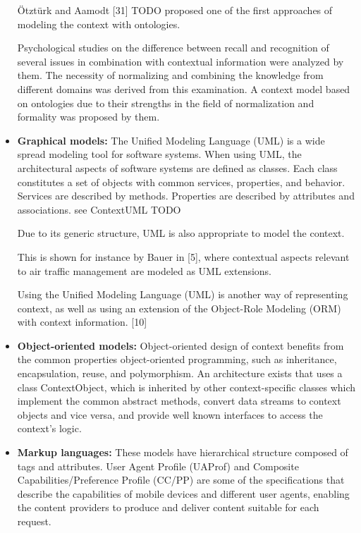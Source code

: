 \begin{itemize}
Ötztürk and Aamodt [31] TODO proposed one of the first approaches of modeling the context with ontologies. 

Psychological studies on the difference between recall and recognition of several issues in combination with contextual information were analyzed by them. The necessity of normalizing and combining the knowledge from different domains was derived from this examination. A context model based on ontologies due to their strengths in the field of normalization and formality was proposed by them.

\item \textbf{Graphical models:} 
The Unified Modeling Language (UML) is a wide spread modeling tool for software systems. When using UML, the architectural aspects of software systems are defined as classes. Each class constitutes a set of objects with common services, properties, and behavior. Services are described by methods. Properties are described by attributes and associations. see ContextUML TODO

Due to its generic structure, UML is also appropriate to model the context. 

This is shown for instance by Bauer in [5], where contextual aspects relevant to air traffic management are modeled as UML extensions.


Using the Unified Modeling Language (UML) is another way of representing context, as well as using an extension of the Object-Role Modeling (ORM) with context information. [10]

\item \textbf{Object-oriented models:} Object-oriented design of context benefits from the common properties object-oriented programming, such as inheritance, encapsulation, reuse, and polymorphism. An architecture exists that uses a class ContextObject, which is inherited by other context-specific classes which implement the common abstract methods, convert data streams to context objects and vice versa, and provide well known interfaces to access the context's logic.

\item \textbf{Markup languages: }These models have hierarchical structure composed of tags and attributes. User Agent Profile (UAProf) and Composite Capabilities/Preference Profile (CC/PP) are some of the specifications that describe the capabilities of mobile devices and different user agents, enabling the content providers to produce and deliver content suitable for each request.
\end{itemize}

